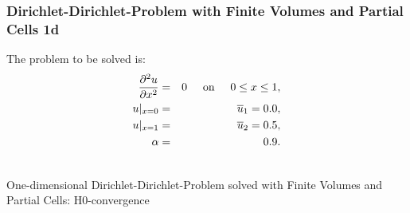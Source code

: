 \documentclass[a4paper,12pt]{article}
\makeatletter
\newenvironment{figurehere}
  {\def\@captype{figure}}
  {}
\makeatother
\begin{document}
\subsubsection{Dirichlet-Dirichlet-Problem with Finite Volumes and Partial Cells 1d}
The problem to be solved is:
\begin{eqnarray}
\frac{\partial^2 u}{\partial x^2} &=& 0 \hspace{0.5cm}\text{on}\hspace{0.5cm}0 \leq x\leq 1,\\
u\vert_{x=0} &=& \overline{u}_1 = 0.0,\\
u\vert_{x=1} &=& \overline{u}_2 = 0.5,\\
\alpha &=& 0.9.
\end{eqnarray}
\begin{center}
\begin{figurehere}
\\
\caption{One-dimensional Dirichlet-Dirichlet-Problem solved with Finite Volumes and Partial Cells: H$0$-convergence}\label{fig:fvdirichlet1dH0}
\end{figurehere}
\end{center}
\end{document}
